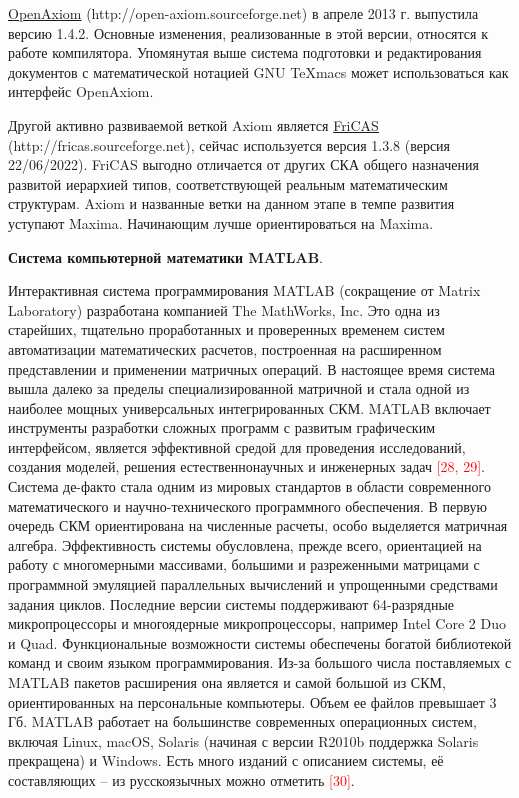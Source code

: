 \underline{OpenAxiom} (http://open-axiom.sourceforge.net) в апреле 2013 г. выпустила версию 1.4.2. Основные изменения, реализованные в этой версии, относятся к работе компилятора. Упомянутая выше система подготовки и редактирования документов с математической нотацией GNU TeXmacs может использоваться как интерфейс OpenAxiom.

Другой активно развиваемой веткой Axiom является \underline{FriCAS} (http://fricas.sourceforge.net), сейчас используется версия 1.3.8 (версия 22/06/2022). FriCAS выгодно отличается от других СКА общего назначения развитой иерархией типов, соответствующей реальным математическим структурам.
Axiom и названные ветки на данном этапе в темпе развития уступают Maxima. Начинающим лучше ориентироваться на Maxima.


\textbf{Система компьютерной математики MATLAB}.

Интерактивная система программирования MATLAB (сокращение от Matrix Laboratory) разработана компанией The MathWorks, Inc. Это одна из старейших, тщательно проработанных и проверенных временем систем автоматизации математических расчетов, построенная на расширенном представлении и применении матричных операций. В настоящее время система вышла далеко за пределы специализированной матричной и стала одной из наиболее мощных универсальных интегрированных СКМ. MATLAB включает инструменты разработки сложных программ с развитым графическим интерфейсом, является эффективной средой для проведения исследований, создания моделей, решения естественнонаучных и инженерных задач \textcolor{red}{[28, 29]}. Система де-факто стала одним из мировых стандартов в области современного математического и научно-технического программного обеспечения. В первую очередь СКМ ориентирована на численные расчеты, особо выделяется матричная алгебра. Эффективность системы обусловлена, прежде всего, ориентацией на работу с многомерными массивами, большими и разреженными матрицами с программной эмуляцией параллельных вычислений и упрощенными средствами задания циклов. Последние версии системы поддерживают 64-разрядные микропроцессоры и многоядерные микропроцессоры, например Intel Core 2 Duo и Quad. Функциональные возможности системы обеспечены богатой библиотекой команд и своим языком программирования. Из-за большого числа поставляемых с MATLAB пакетов расширения она является и самой большой из СКМ, ориентированных на персональные компьютеры. Объем ее файлов превышает 3 Гб. 
MATLAB работает на большинстве современных операционных систем, включая Linux, macOS, Solaris (начиная с версии R2010b поддержка Solaris прекращена) и Windows. 
Есть много изданий с описанием системы, её составляющих -- из русскоязычных можно отметить \textcolor{red}{[30]}. 

